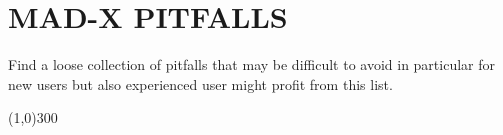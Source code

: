 %  
% 




\section{MAD-X PITFALLS}

  Find a loose collection of pitfalls that may be difficult to avoid in particular for new users but also experienced user might profit from this list. 

\line(1,0){300}

